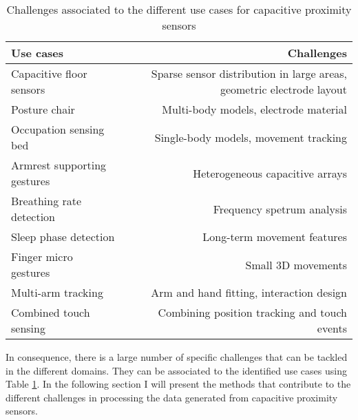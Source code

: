 \begin{table}[htbp]
  \centering
  \caption{Challenges associated to the different use cases for capacitive proximity sensors}
    \begin{tabular}{lr}
    \toprule
    Use cases & Challenges \\
    \midrule
    Capacitive floor sensors & Sparse sensor distribution in large areas, geometric electrode layout \\
    Posture chair & Multi-body models, electrode material \\
    Occupation sensing bed & Single-body models, movement tracking \\
    Armrest supporting gestures & Heterogeneous capacitive arrays \\
    Breathing rate detection & Frequency spetrum analysis \\
    Sleep phase detection & Long-term movement features \\
    Finger micro gestures & Small 3D movements \\
    Multi-arm tracking & Arm and hand fitting, interaction design \\
    Combined touch sensing & Combining position tracking and touch events \\
    \bottomrule
    \end{tabular}%
  \label{tab:usecase_challenge}%
\end{table}%

In consequence, there is a large number of specific challenges that can be tackled in the different domains. They can be associated to the identified use cases using Table \ref{tab:usecase_challenge}. In the following section I will present the methods that contribute to the different challenges in processing the data generated from capacitive proximity sensors.

   